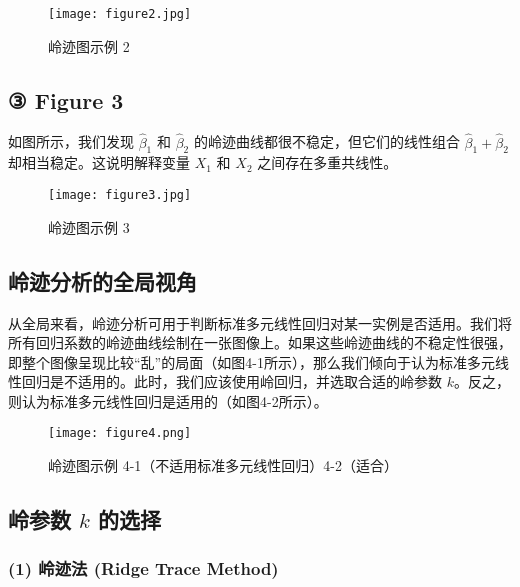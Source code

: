 \documentclass[lang=cn,11pt,a4paper]{elegantpaper}
\begin{document}
    \begin{figure}[h]
        \centering
        \texttt{[image: figure2.jpg]}
        \caption{岭迹图示例 2}
        \label{fig:figure2}
    \end{figure}
    
    \subsection*{③ Figure 3}
    
    如图所示，我们发现 \(\hat{\beta}_1\) 和 \(\hat{\beta}_2\) 的岭迹曲线都很不稳定，但它们的线性组合 \(\hat{\beta}_1 + \hat{\beta}_2\) 却相当稳定。这说明解释变量 \(X_1\) 和 \(X_2\) 之间存在多重共线性。
    
    \begin{figure}[h]
        \centering
        \texttt{[image: figure3.jpg]}
        \caption{岭迹图示例 3}
        \label{fig:figure3}
    \end{figure}
    
    \subsection*{岭迹分析的全局视角}
    
    从全局来看，岭迹分析可用于判断标准多元线性回归对某一实例是否适用。我们将所有回归系数的岭迹曲线绘制在一张图像上。如果这些岭迹曲线的不稳定性很强，即整个图像呈现比较“乱”的局面（如图4-1所示），那么我们倾向于认为标准多元线性回归是不适用的。此时，我们应该使用岭回归，并选取合适的岭参数 \(k\)。反之，则认为标准多元线性回归是适用的（如图4-2所示）。
    
    \begin{figure}[h]
        \centering
        \texttt{[image: figure4.png]}
        \caption{岭迹图示例 4-1（不适用标准多元线性回归）4-2（适合）}
        \label{fig:figure4_1}
    \end{figure}
    
    
    
    \subsection*{岭参数 \(k\) 的选择}
    
    \subsubsection*{(1) 岭迹法 (Ridge Trace Method)}
    
\end{document}
